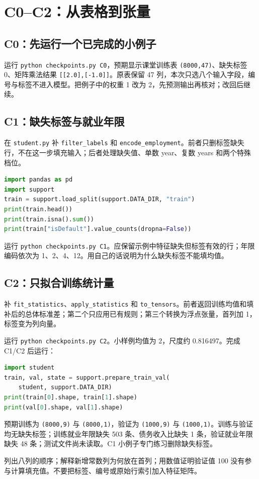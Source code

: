 \documentclass[UTF8,a4paper,11pt,fontset=fandol]{ctexart}
\newcommand{\file}[1]{\nolinkurl{#1}}
\begin{document}
\section{C0--C2：从表格到张量}
\subsection{C0：先运行一个已完成的小例子}
运行 \texttt{python checkpoints.py C0}，预期显示课堂训练表 \texttt{(8000,47)}、缺失标签 0、矩阵乘法结果 \texttt{[[2.0],[-1.0]]}。原表保留 47 列，本次只选八个输入字段，编号与标签不进入模型。把例子中的权重 1 改为 2，先预测输出再核对；改回后继续。
\subsection{C1：缺失标签与就业年限}
在 \file{student.py} 补 \texttt{filter\_labels} 和 \texttt{encode\_employment}。前者只删标签缺失行，不在这一步填充输入；后者处理缺失值、单数 year、复数 years 和两个特殊档位。
\begin{lstlisting}[language=Python]
import pandas as pd
import support
train = support.load_split(support.DATA_DIR, "train")
print(train.head())
print(train.isna().sum())
print(train["isDefault"].value_counts(dropna=False))
\end{lstlisting}
运行 \texttt{python checkpoints.py C1}。应保留示例中特征缺失但标签有效的行；年限编码依次为 1、2、4、12。用自己的话说明为什么缺失标签不能填均值。
\subsection{C2：只拟合训练统计量}
补 \texttt{fit\_statistics}、\texttt{apply\_statistics} 和 \texttt{to\_tensors}。前者返回训练均值和填补后的总体标准差；第二个只应用已有规则；第三个转换为浮点张量，首列加 1，标签变为列向量。

运行 \texttt{python checkpoints.py C2}。小样例均值为 2，尺度约 0.816497。完成 C1/C2 后运行：
\begin{lstlisting}[language=Python]
import student
train, val, state = support.prepare_train_val(
    student, support.DATA_DIR)
print(train[0].shape, train[1].shape)
print(val[0].shape, val[1].shape)
\end{lstlisting}
预期训练为 \texttt{(8000,9)} 与 \texttt{(8000,1)}，验证为 \texttt{(1000,9)} 与 \texttt{(1000,1)}。训练与验证均无缺失标签；训练就业年限缺失 503 条、债务收入比缺失 1 条，验证就业年限缺失 48 条；测试文件尚未读取。C1 小例子专门练习删除缺失标签。
\begin{questionbox}[验收证据]
列出八列的顺序；解释新增常数列为何放在首列；用数值证明验证值 100 没有参与计算填充值。不要把标签、编号或原始行索引加入特征矩阵。
\end{questionbox}
\clearpage
\end{document}
